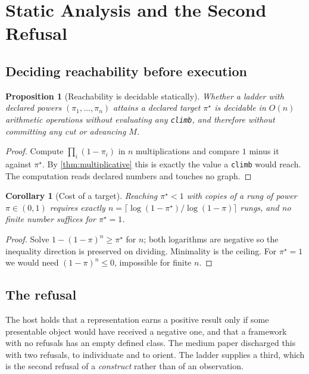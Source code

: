 \documentclass[11pt,twocolumn,a4paper]{article}
\theoremstyle{plain}
\newtheorem{proposition}[theorem]{Proposition}
\newtheorem{corollary}[theorem]{Corollary}
\theoremstyle{definition}
\theoremstyle{remark}
\newcommand{\pow}{\pi}
\newcommand{\shk}[1]{\texttt{#1}}
\begin{document}
\section{Static Analysis and the Second Refusal}
\label{sec:refusal}

\subsection{Deciding reachability before execution}

\begin{proposition}[Reachability is decidable statically]
\label{prop:static}
Whether a ladder with declared powers $(\pow_1,\dots,\pow_n)$ attains a
declared target $\pow^\star$ is decidable in $O(n)$ arithmetic operations
without evaluating any \shk{climb}, and therefore without committing any cut or
advancing $M$.
\end{proposition}

\begin{proof}
Compute $\prod_i(1-\pow_i)$ in $n$ multiplications and compare $1$ minus it
against $\pow^\star$. By \cref{thm:multiplicative} this is exactly the value a
\shk{climb} would reach. The computation reads declared numbers and touches no
graph.
\end{proof}

\begin{corollary}[Cost of a target]
\label{cor:cost}
Reaching $\pow^\star<1$ with copies of a rung of power $\pow\in(0,1)$ requires
exactly $n=\lceil \log(1-\pow^\star)/\log(1-\pow)\rceil$ rungs, and no finite
number suffices for $\pow^\star=1$.
\end{corollary}

\begin{proof}
Solve $1-(1-\pow)^n\ge\pow^\star$ for $n$; both logarithms are negative so the
inequality direction is preserved on dividing. Minimality is the ceiling.
For $\pow^\star=1$ we would need $(1-\pow)^n\le0$, impossible for finite $n$.
\end{proof}

\subsection{The refusal}

The host holds that a representation earns a positive result only if some
presentable object would have received a negative one, and that a framework
with no refusals has an empty defined class. The medium paper discharged this
with two refusals, to individuate and to orient. The ladder supplies a third,
which is the second refusal of a \emph{construct} rather than of an
observation.
\end{document}
